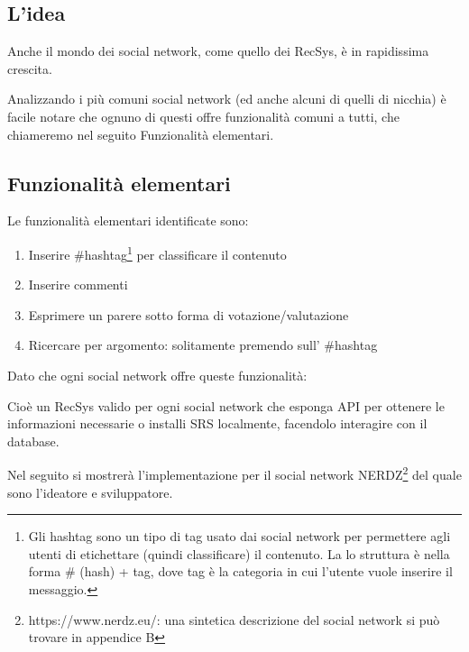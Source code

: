 \subsection{L'idea}
Anche il mondo dei social network, come quello dei RecSys, è in rapidissima crescita.

Analizzando i più comuni social network (ed anche alcuni di quelli di nicchia) è facile notare che ognuno di questi offre funzionalità comuni a tutti, che chiameremo nel seguito Funzionalità elementari.
\subsection{Funzionalità elementari} \label{ss:fe}
Le funzionalità elementari identificate sono:
\begin{enumerate}
    \item Inserire \#hashtag\footnote{Gli hashtag sono un tipo di tag usato dai social network per permettere agli utenti di etichettare (quindi classificare) il contenuto. La lo struttura è nella forma \# (hash) + tag, dove tag è la categoria in cui l'utente vuole inserire il messaggio.} per classificare il contenuto
    \item Inserire commenti
    \item Esprimere un parere sotto forma di votazione/valutazione
    \item Ricercare per argomento: solitamente premendo sull' \#hashtag
\end{enumerate}

Dato che ogni social network offre queste funzionalità:
\begin{quotation}
\end{quotation}

Cioè un RecSys valido per ogni social network che esponga API per ottenere le informazioni necessarie o installi SRS localmente, facendolo interagire con il database.

Nel seguito si mostrerà l'implementazione per il social network NERDZ\footnote{https://www.nerdz.eu/: una sintetica descrizione del social network si può trovare in appendice B} del quale sono l'ideatore e sviluppatore.

